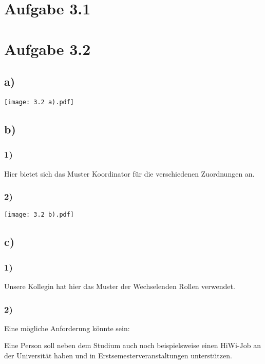 \documentclass[a4paper,11pt]{scrartcl}
\begin{document}
		
	\section*{Aufgabe 3.1}
	
	\section*{Aufgabe 3.2}
	\subsection*{a)}
	\texttt{[image: 3.2 a).pdf]}
	
	\subsection*{b)}
	\subsubsection*{1)}
		Hier bietet sich das Muster Koordinator für die verschiedenen Zuordnungen an.
	\subsubsection*{2)}
		\texttt{[image: 3.2 b).pdf]}
	
	\subsection*{c)}
	\subsubsection*{1)}
		Unsere Kollegin hat hier das Muster der Wechselenden Rollen verwendet.
	\subsubsection*{2)}
		Eine mögliche Anforderung könnte sein:
		\begin{center}
		Eine Person soll neben dem Studium auch noch beispielsweise einen HiWi-Job an der Universität haben und in Erstsemesterveranstaltungen unterstützen.
		\end{center}
	
\end{document}
